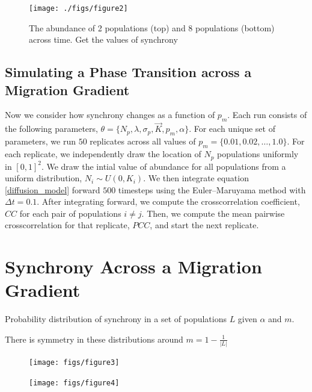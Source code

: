 \documentclass[]{article}
\begin{document}
\begin{figure}[h]
\texttt{[image: ./figs/figure2]}
\caption{The abundance of 2 populations (top) and 8 populations (bottom) across time. Get the values of synchrony }
\label{async_and_sync}

\end{figure}

\hypertarget{simulating-a-phase-transition-across-a-migration-gradient}{%
\subsection{Simulating a Phase Transition across a Migration
Gradient}\label{simulating-a-phase-transition-across-a-migration-gradient}}

Now we consider how synchrony changes as a function of \(p_m\). Each run
consists of the following parameters,
\(\theta = \{N_p, \lambda, \sigma_p, \vec{K},p_m, \alpha \}\). For each
unique set of parameters, we run \(50\) replicates across all values of
\(p_m = \{0.01,0.02,\dots,1.0 \}\). For each replicate, we independently
draw the location of \(N_p\)     populations uniformly in \([0,1]^2\). We
draw the intial value of abundance for all populations from a uniform
distribution, \(N_i \sim U(0, K_i)\). We then integrate equation
\ref{diffusion_model} forward \(500\) timesteps using the
Euler--Maruyama method with \(\Delta t=0.1\). After integrating forward,
we compute the crosscorrelation coefficient, \(CC\) for each pair of
populations \(i \neq j\). Then, we compute the mean pairwise
crosscorrelation for that replicate, \(PCC\), and start the next
replicate.


\hypertarget{phase-transitions-across-a-migration-gradient}{%
\section{Synchrony Across a Migration Gradient}\label{phase-transitions-across-a-migration-gradient}}

Probability distribution of synchrony in a set of populations $L$ given $\alpha$ and $m$.

There is symmetry in these distributions around $m = 1 - \frac{1}{|L|}$


\pagebreak
\begin{figure}[h]
    \texttt{[image: figs/figure3]}
    \caption{}
    \label{}
\end{figure}

\begin{figure}[h]
    \texttt{[image: figs/figure4]}
    \caption{}
    \label{}
\end{figure}
\end{document}
